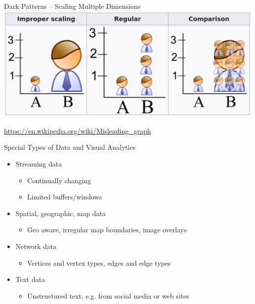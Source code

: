 \documentclass[ignorenonframetext,xcolor=x11names]{beamer}
\begin{document}
\begin{frame}{Dark Patterns -- Scaling Multiple Dimensions}
\centering
\includegraphics[width=\textwidth]{screen1.png}

\scriptsize\url{https://en.wikipedia.org/wiki/Misleading_graph}
\end{frame}

\begin{frame}{Special Types of Data and Visual Analytics}
	\begin{itemize}
		\item Streaming data
		\begin{itemize}
			\item Continually changing
			\item Limited buffers/windows
		\end{itemize}
		\item Spatial, geographic, map data
		\begin{itemize}
		   \item Geo aware, irregular map boundaries, image overlays
		\end{itemize}
		\item Network data
		\begin{itemize}
		   \item Vertices and vertex types, edges and edge types
		\end{itemize}
		\item Text data
		\begin{itemize}
		   \item Unstructured text, e.g. from social media or web sites
		\end{itemize}
	\end{itemize}
\end{frame}
\end{document}
